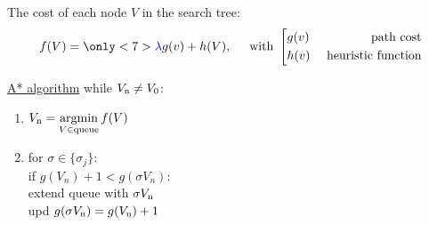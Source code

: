 The cost of each node $V$ in the search tree:
\begin{equation*}
	f(V) = 
	\only<7>{\textcolor{blue}{\lambda}} 
	g(v) + h(V), 
	\hspace{5 mm} 
	\text{with }
	\left[\begin{aligned}
	    &g(v) &\text{ path cost} \\
	    &h(v) &\text{ heuristic function} \\
	\end{aligned}\right.
\end{equation*}

\begin{minipage}{0.55\textwidth}

\begin{beamerboxesrounded}[upper=block title, lower=block body,shadow=true]{\underline{A* algorithm}}
while $V_{\textnormal{n}} \neq V_0$:
\begin{enumerate}
	\item $V_{\textnormal{n}} = \mathop{\mathrm{argmin}}\nolimits\limits_{V \in \text{queue}} f(V)$
	\item for $\sigma \in \{\sigma_j\}$: \\
	\hspace{5mm} if $g(V_n)+1 < g(\sigma V_n)$: \\
	\hspace{10mm} extend queue with $\sigma V_{\textnormal{n}}$ \\
	\hspace{10mm} upd $g(\sigma V_{\textnormal{n}}) = g(V_{\textnormal{n}}) + 1$
\end{enumerate}
\end{beamerboxesrounded}

\end{minipage}
\hfill
